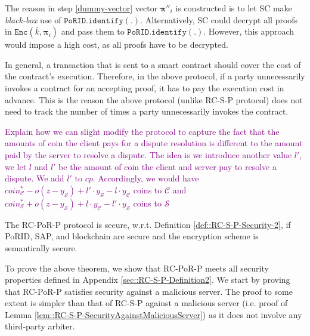 \begin{remark}
The reason in step \ref{dummy-vector} vector $ {\bm{\pi}}''_{\scriptscriptstyle i}$ is constructed  is to let SC make \emph{black-box}  use of $\mathtt{PoRID.identify}(.)$. Alternatively, SC could decrypt all proofs in $\mathtt{Enc}(\bar{k}, {\bm{\pi}}_{\scriptscriptstyle i})$ and pass them to $\mathtt{PoRID.identify}(.)$. However, this approach would impose a high cost, as all proofs have to be decrypted. 
\end{remark}

\begin{remark}
In general, a transaction that is sent   to a smart contract should  cover the cost of the contract's execution. Therefore, in the above protocol, if a party unnecessarily invokes a contract for an accepting proof, it has to pay the execution cost in advance. This is the reason the above protocol (unlike RC-S-P protocol) does not need to track the number of times a party unnecessarily invokes the contract.    
\end{remark}


\begin{remark}
\textcolor{purple}{Explain how we can slight modify the protocol to capture the fact  that the amounts of coin the client pays for a dispute resolution is different to the amount paid by the server to resolve a dispute. The idea is we introduce another value $l'$, we let $l$ and $l'$ be the amount of coin the client and server pay to resolve a dispute.  We add $l'$ to $cp$. Accordingly, we would have $coin^{\scriptscriptstyle *}_{\scriptscriptstyle\mathcal C}-o(z-y_{\scriptscriptstyle\mathcal S})+l'\cdot y_{\scriptscriptstyle\mathcal S}-l\cdot y_{\scriptscriptstyle\mathcal C}$ coins  to $\mathcal C$ and  $coin^{\scriptscriptstyle *}_{\scriptscriptstyle\mathcal S}+o(z-y_{\scriptscriptstyle\mathcal S})+l\cdot y_{\scriptscriptstyle\mathcal C}-l'\cdot y_{\scriptscriptstyle\mathcal S}$ coins to $\mathcal S$}
\end{remark}


\begin{theorem}
The RC-PoR-P protocol is secure, w.r.t. Definition \ref{def::RC-S-P-Security-2}, if PoRID, SAP, and blockchain are secure and the encryption scheme is semantically secure. 
\end{theorem}



 To prove the above theorem, we show that RC-PoR-P meets all security properties defined in Appendix \ref{sec::RC-S-P-Definition2}.  We start by proving that RC-PoR-P satisfies security against a malicious server.   The proof to some extent is  simpler than that  of RC-S-P against a malicious server (i.e. proof of Lemma \ref{lem::RC-S-P-SecurityAgainstMaliciousServer})  as it does not involve any third-party arbiter. 

 
 



%



